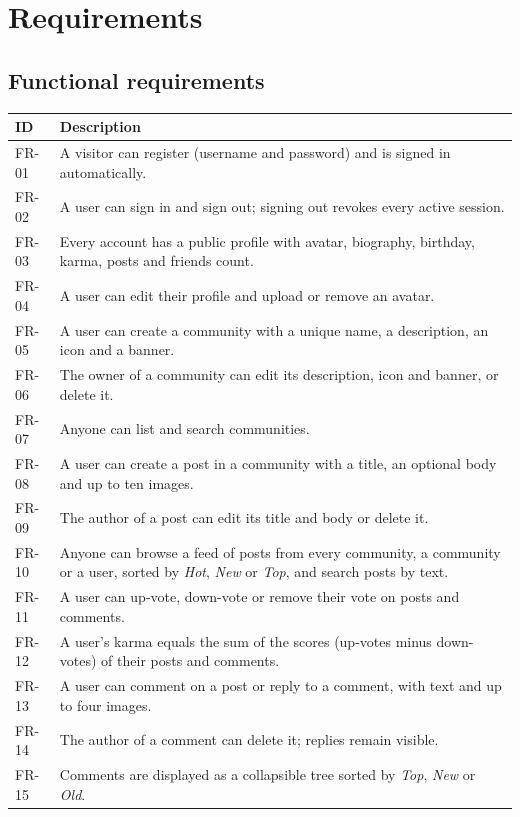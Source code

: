 \documentclass[11pt,a4paper]{article}
\begin{document}
\section{Requirements}

\subsection{Functional requirements}

\begin{longtable}{@{}lp{13cm}@{}}
\toprule
\textbf{ID} & \textbf{Description} \\
\midrule
\endhead
FR-01 & A visitor can register (username and password) and is signed in automatically. \\
FR-02 & A user can sign in and sign out; signing out revokes every active session. \\
FR-03 & Every account has a public profile with avatar, biography, birthday, karma, posts and friends count. \\
FR-04 & A user can edit their profile and upload or remove an avatar. \\
FR-05 & A user can create a community with a unique name, a description, an icon and a banner. \\
FR-06 & The owner of a community can edit its description, icon and banner, or delete it. \\
FR-07 & Anyone can list and search communities. \\
FR-08 & A user can create a post in a community with a title, an optional body and up to ten images. \\
FR-09 & The author of a post can edit its title and body or delete it. \\
FR-10 & Anyone can browse a feed of posts from every community, a community or a user, sorted by \emph{Hot}, \emph{New} or \emph{Top}, and search posts by text. \\
FR-11 & A user can up-vote, down-vote or remove their vote on posts and comments. \\
FR-12 & A user's karma equals the sum of the scores (up-votes minus down-votes) of their posts and comments. \\
FR-13 & A user can comment on a post or reply to a comment, with text and up to four images. \\
FR-14 & The author of a comment can delete it; replies remain visible. \\
FR-15 & Comments are displayed as a collapsible tree sorted by \emph{Top}, \emph{New} or \emph{Old}. \\

\end{longtable}
\end{document}
